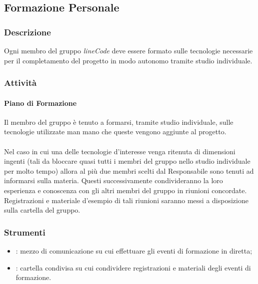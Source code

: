\subsection{Formazione Personale}

	\subsubsection{Descrizione}
	Ogni membro del gruppo \textit{lineCode} deve essere formato sulle tecnologie necessarie per il completamento del progetto in modo autonomo tramite studio individuale.

    \subsubsection{Attività}
        \paragraph{Piano di Formazione}
        Il membro del gruppo è tenuto a formarsi, tramite studio individuale, sulle tecnologie utilizzate man mano che queste vengono aggiunte al progetto.
        \\\\
        Nel caso in cui una delle tecnologie d'interesse venga ritenuta di dimensioni ingenti (tali da bloccare quasi tutti i membri del gruppo nello studio individuale per molto tempo) allora al più due membri scelti dal Responsabile sono tenuti ad informarsi sulla materia. Questi successivamente condivideranno la loro esperienza e conoscenza con gli altri membri del gruppo in riunioni concordate. Registrazioni e materiale d'esempio di tali riunioni saranno messi a disposizione sulla cartella  del gruppo.

    \subsubsection{Strumenti}
    \begin{itemize}
        \item \textbf{}: mezzo di comunicazione su cui effettuare gli eventi di formazione in diretta;
        \item \textbf{}: cartella condivisa su cui condividere registrazioni e materiali degli eventi di formazione.
    \end{itemize}
